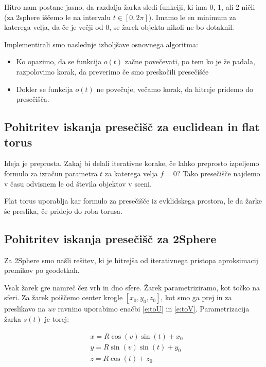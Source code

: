 \documentclass[titlepage]{article}
\begin{document}
Hitro nam postane jasno, da razdalja žarka sledi funkciji, ki ima 0, 1, ali 2 ničli (za 2sphere iščemo le na intervalu \(t \in [0, 2\pi] \)). 
Imamo le en minimum za katerega velja, da če je večji od 0, se žarek objekta nikoli ne bo dotaknil.

Implementirali smo naslednje izboljšave osnovnega algoritma:
\begin{itemize}
  \item Ko opazimo, da se funkcija \( o(t) \) začne povečevati, po tem ko je že padala, 
  razpolovimo korak, da preverimo če smo preskočili presečišče
  \item Dokler se funkcija \( o(t) \) ne povečuje, večamo korak, da hitreje pridemo do presečišča.
\end{itemize}

\subsection{Pohitritev iskanja presečišč za euclidean in flat torus}

Ideja je preprosta. Zakaj bi delali iterativne korake, če lahko preprosto izpeljemo 
formulo za izračun parametra \( t \) za katerega velja \( f = 0 \)? Tako presečišče 
najdemo v času odvisnem le od števila objektov v sceni.

Flat torus uporablja kar formulo za presečišče iz evklidskega prostora, le da žarke še preslika, če pridejo do roba torusa.

\subsection{Pohitritev iskanja presečišč za 2Sphere}

Za 2Sphere smo našli rešitev, ki je hitrejša od iterativnega pristopa aproksimacij premikov po geodetkah.

Vsak žarek gre namreč čez vrh in dno sfere. Žarek parametriziramo, kot točko na sferi. Za žarek poiščemo center 
krogle \( [x_0, y_0, z_0] \), kot smo ga prej in za preslikavo na $uv$ ravnino uporabimo enačbi \ref{e:toU} in \ref{e:toV}. 
Parametrizacija žarka \(s(t)\) je torej:

\begin{equation}
  \begin{split}
    &x = R\cos(v)\sin(t) + x_0 \\
    &y = R\sin(v) \sin(t) + y_0 \\
    &z = R\cos(t) + z_0
  \end{split}
\end{equation}
\end{document}
